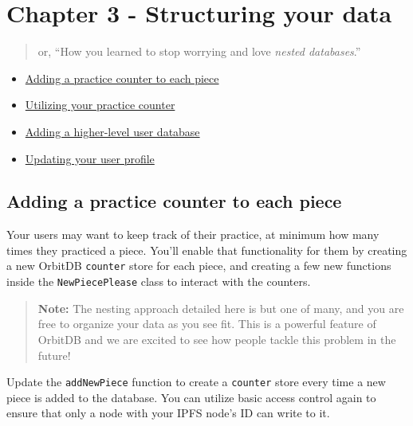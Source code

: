 \section{Chapter 3 - Structuring your
data}\label{chapter-3---structuring-your-data}

\begin{quote}
or, ``How you learned to stop worrying and love \emph{nested
databases}.''
\end{quote}

\begin{itemize}
\tightlist
\item
  \protect\hyperlink{}{Adding a practice counter to each piece}
\item
  \protect\hyperlink{}{Utilizing your practice counter}
\item
  \protect\hyperlink{}{Adding a higher-level user database}
\item
  \protect\hyperlink{}{Updating your user profile}
\end{itemize}

\subsection{Adding a practice counter to each
piece}\label{adding-a-practice-counter-to-each-piece}

Your users may want to keep track of their practice, at minimum how many
times they practiced a piece. You'll enable that functionality for them
by creating a new OrbitDB \texttt{counter} store for each piece, and
creating a few new functions inside the \texttt{NewPiecePlease} class to
interact with the counters.

\begin{quote}
\textbf{Note:} The nesting approach detailed here is but one of many,
and you are free to organize your data as you see fit. This is a
powerful feature of OrbitDB and we are excited to see how people tackle
this problem in the future!
\end{quote}

Update the \texttt{addNewPiece} function to create a \texttt{counter}
store every time a new piece is added to the database. You can utilize
basic access control again to ensure that only a node with your IPFS
node's ID can write to it.

